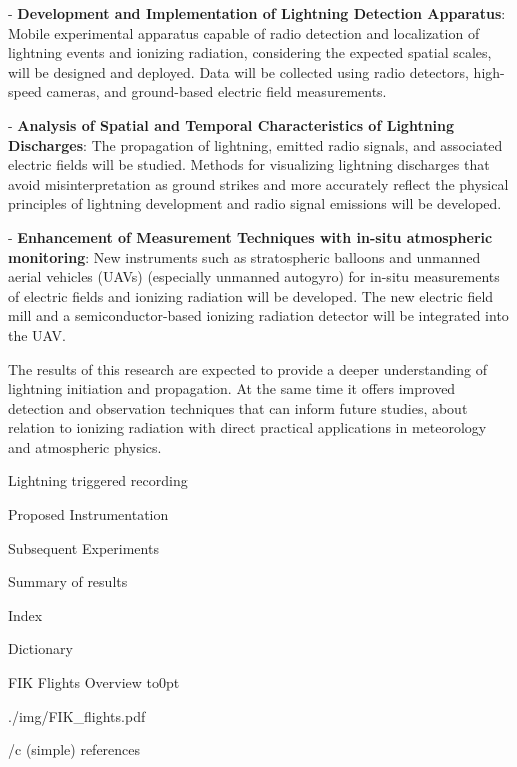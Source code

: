 \begitems
\item - {\bf Development and Implementation of Lightning Detection Apparatus}: Mobile experimental apparatus capable of radio detection and localization of lightning events and ionizing radiation, considering the expected spatial scales, will be designed and deployed. Data will be collected using radio detectors, high-speed cameras, and ground-based electric field measurements.
\item - {\bf Analysis of Spatial and Temporal Characteristics of Lightning Discharges}: The propagation of lightning, emitted radio signals, and associated electric fields will be studied. Methods for visualizing lightning discharges that avoid misinterpretation as ground strikes and more accurately reflect the physical principles of lightning development and radio signal emissions will be developed.
\item - {\bf Enhancement of Measurement Techniques with in-situ atmospheric monitoring}: New instruments such as stratospheric balloons and unmanned aerial vehicles (UAVs) (especially unmanned autogyro) for in-situ measurements of electric fields and ionizing radiation will be developed. The new electric field mill and a semiconductor-based ionizing radiation detector will be integrated into the UAV.
\enditems

The results of this research are expected to provide a deeper understanding of lightning initiation and propagation. At the same time it offers improved detection and observation techniques that can inform future studies, about relation to ionizing radiation with direct practical applications in meteorology and atmospheric physics.

 

 Lightning triggered recording 

 

\chap[instrumentation] Proposed Instrumentation

 

\chap[experiments] Subsequent Experiments

 

\chap[results] Summary of results

 

\app Index
\makeindex

\app Dictionary
\makeglos

 FIK Flights Overview
\vbox to0pt{\vskip-25mm\centerline{\inspic ./img/FIK_flights.pdf }\vss}
\nextoddpage

\bibchap
\usebib/c (simple) references



\bye
